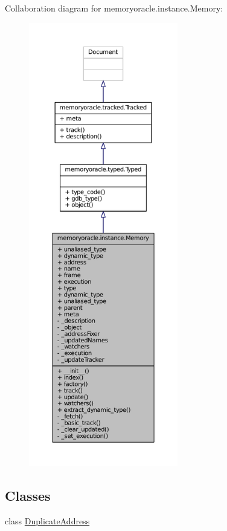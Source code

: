 Collaboration diagram for memoryoracle.\+instance.\+Memory\+:
\nopagebreak
\begin{figure}[H]
\begin{center}
\leavevmode
\includegraphics[height=550pt]{classmemoryoracle_1_1instance_1_1Memory__coll__graph}
\end{center}
\end{figure}
\subsection*{Classes}
\begin{DoxyCompactItemize}
\item 
class \hyperlink{classmemoryoracle_1_1instance_1_1Memory_1_1DuplicateAddress}{Duplicate\+Address}
\end{DoxyCompactItemize}
